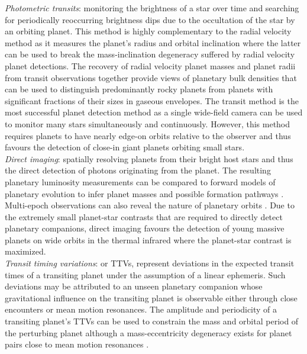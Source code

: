 \emph{Photometric transits}: monitoring the brightness of a star over time and
searching for periodically reoccurring brightness dips due to the occultation of the star
by an orbiting planet. This method is highly complementary to the radial velocity method
as it measures the planet's radius and orbital inclination where the latter can be
used to break the mass-inclination degeneracy suffered by radial velocity planet
detections. The recovery of radial velocity planet masses and planet radii from transit observations
together provide
views of planetary bulk densities that can be used to distinguish predominantly
rocky planets from planets with significant fractions of their sizes in gaseous envelopes.
The transit method is the most successful planet detection method as a single
wide-field camera can be used to monitor many stars simultaneously and continuously.
However, this method requires planets to have nearly edge-on orbits relative to the observer
and thus favours the detection of close-in giant planets orbiting small stars. \\

\emph{Direct imaging}: spatially resolving planets from their bright host stars and thus the
direct detection of photons originating from the planet. The resulting planetary luminosity
measurements can be compared to forward models of planetary
evolution to infer planet masses and possible formation pathways \citep{marley07}.
Multi-epoch observations can also reveal the nature of planetary orbits \citep{wang18}.
Due to the extremely small planet-star contrasts that are required to directly detect planetary 
companions, direct imaging favours the detection of young massive planets on wide orbits in the 
thermal infrared where the planet-star contrast is maximized. \\

\emph{Transit timing variations}: or TTVs, represent deviations in the expected transit
times of a transiting planet under the assumption of a linear ephemeris. Such deviations
may be attributed to an unseen planetary companion whose gravitational influence on the
transiting planet is observable either through close encounters or mean motion resonances.
The amplitude and periodicity of a transiting planet's TTVs can be used to constrain the mass
and orbital period of the perturbing planet although a mass-eccentricity degeneracy exists
for planet pairs close to mean motion resonances \citep{lithwick12}. \\

